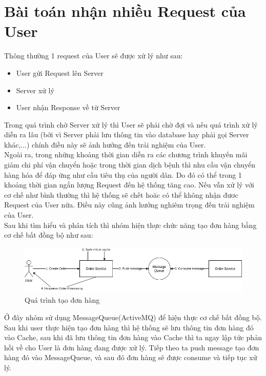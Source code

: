 		
		\section{Bài toán nhận nhiều Request của User}
		Thông thường 1 request của User sẽ được xử lý như sau: 
		
		    \begin{itemize}
                \item User gửi Request lên Server
                \item Server xử lý
                \item User nhận Response về từ Server 
            \end{itemize}
        
        Trong quá trình chờ Server xử lý thì User sẽ phải chờ đợi và nếu quá trình xử lý diễn ra lâu (bởi vì Server phải lưu thông tin vào database hay phải gọi Server khác,...) chính điều này sẽ ảnh hưởng đến trải nghiệm của User.\\
        
        Ngoài ra, trong những khoảng thời gian diễn ra các chương trình khuyến mãi giảm chi phí vận chuyển hoặc trong thời gian dịch bệnh thì nhu cầu vận chuyển hàng hóa để đáp ứng như cầu tiêu thụ của người dân. Do đó có thể trong 1 khoảng thời gian ngắn lượng Request đến hệ thống tăng cao. Nếu vẫn xử lý với cơ chế như bình thường thì hệ thống sẽ chết hoăc có thể không nhận đươc Request của User nữa. Điều này cũng ảnh hưởng nghiêm trọng đến trải nghiệm của User.\\
        
        Sau khi tìm hiểu và phân tích thì nhóm hiện thực chức năng tạo đơn hàng bằng cơ chế bất đồng bộ như sau:\\
        
        \begin{figure}[H]
			\includegraphics[width=1\textwidth]{Images/problem1.jpg}
			\centering
			\linebreak
			\caption{Quá trình tạo đơn hàng}
		\end{figure}
        
        Ở đây nhóm sử dụng MessageQueue(ActiveMQ) để hiện thực cơ chế bất đồng bộ. Sau khi user thực hiện tạo đơn hàng thì hệ thống sẽ lưu thông tin đơn hàng đó vào Cache, sau khi đã lưu thông tin đơn hàng vào Cache thì ta ngay lập tức phản hồi về cho User là đơn hàng đang được xử lý. Tiếp theo ta push message tạo đơn hàng đó vào MessageQueue, và sau đó đơn hàng sẽ được consume và tiếp tục xử lý.\\
        
